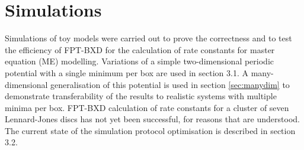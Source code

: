 \chapter{Simulations}

Simulations of toy models were carried out to prove the correctness and to test the efficiency of FPT-BXD for the calculation of rate constants for master equation (ME) modelling.
Variations of a simple two-dimensional periodic potential with a single minimum per box are used in section 3.1.
A many-dimensional generalisation of this potential is used in section \ref{sec:manydim} to demonstrate transferability of the results to realistic systems with multiple minima per box.
FPT-BXD calculation of rate constants for a cluster of seven Lennard-Jones discs has not yet been successful, for reasons that are understood.
The current state of the simulation protocol optimisation is described in section 3.2.

